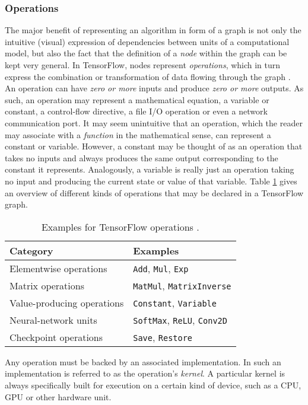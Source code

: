 \subsubsection{Operations}\label{sec:model-graphs-ops}

The major benefit of representing an algorithm in form of a graph is not only
the intuitive (visual) expression of dependencies between units of a
computational model, but also the fact that the definition of a \emph{node}
within the graph can be kept very general. In TensorFlow, nodes represent
\emph{operations}, which in turn express the combination or transformation of
data flowing through the graph \cite{tensorflow}. An operation can have
\emph{zero or more} inputs and produce \emph{zero or more} outputs. As such, an
operation may represent a mathematical equation, a variable or constant, a
control-flow directive, a file I/O operation or even a network communication
port. It may seem unintuitive that an operation, which the reader may associate
with a \emph{function} in the mathematical sense, can represent a constant or
variable. However, a constant may be thought of as an operation that takes no
inputs and always produces the same output corresponding to the constant it
represents. Analogously, a variable is really just an operation taking no input
and producing the current state or value of that variable. Table \ref{tab:ops}
gives an overview of different kinds of operations that may be declared in a
TensorFlow graph.

\begin{table}[h!]
  \begin{tabular}{ll}
    \textbf{Category} & \textbf{Examples}
    \\ \toprule
    Elementwise operations & \texttt{Add}, \texttt{Mul}, \texttt{Exp}
    \\
    Matrix operations & \texttt{MatMul}, \texttt{MatrixInverse}
    \\
    Value-producing operations & \texttt{Constant}, \texttt{Variable}
    \\
    Neural-network units & \texttt{SoftMax}, \texttt{ReLU}, \texttt{Conv2D}
    \\
    Checkpoint operations & \texttt{Save}, \texttt{Restore}
    \end{tabular}
    \label{tab:ops}
    \caption{Examples for TensorFlow operations \cite{tensorflow}.}
\end{table}

Any operation must be backed by an associated implementation. In
\cite{tensorflow} such an implementation is referred to as the operation's
\emph{kernel}. A particular kernel is always specifically built for execution on
a certain kind of device, such as a CPU, GPU or other hardware unit.

